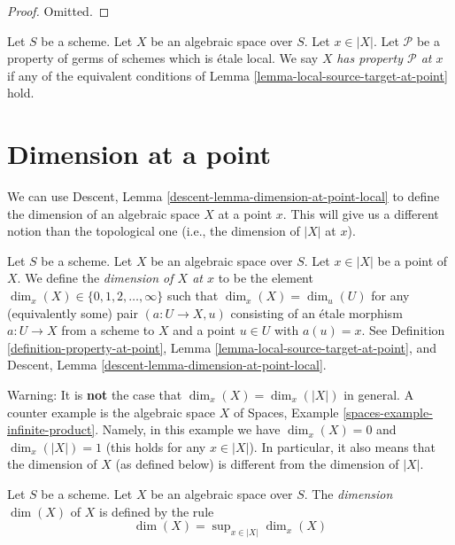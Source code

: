 \begin{proof}
Omitted.
\end{proof}

\begin{definition}
\label{definition-property-at-point}
Let $S$ be a scheme. Let $X$ be an algebraic space over $S$.
Let $x \in |X|$. Let $\mathcal{P}$ be a property of germs of schemes which is
\'etale local.
We say $X$ {\it has property $\mathcal{P}$ at $x$} if any of the
equivalent conditions of
Lemma \ref{lemma-local-source-target-at-point}
hold.
\end{definition}





\section{Dimension at a point}
\label{section-dimension}

\noindent
We can use
Descent, Lemma \ref{descent-lemma-dimension-at-point-local}
to define the dimension of an algebraic
space $X$ at a point $x$. This will give us a different notion than the
topological one (i.e., the dimension of $|X|$ at $x$).

\begin{definition}
\label{definition-dimension-at-point}
Let $S$ be a scheme.
Let $X$ be an algebraic space over $S$.
Let $x \in |X|$ be a point of $X$.
We define the {\it dimension of $X$ at $x$} to be
the element $\dim_x(X) \in \{0, 1, 2, \ldots, \infty\}$
such that $\dim_x(X) = \dim_u(U)$ for any (equivalently some)
pair $(a : U \to X, u)$ consisting of an \'etale morphism $a : U \to X$
from a scheme to $X$ and a point $u \in U$ with $a(u) = x$.
See
Definition \ref{definition-property-at-point},
Lemma \ref{lemma-local-source-target-at-point}, and
Descent, Lemma \ref{descent-lemma-dimension-at-point-local}.
\end{definition}

\noindent
Warning: It is {\bf not} the case that $\dim_x(X) = \dim_x(|X|)$
in general. A counter example is the algebraic space $X$ of
Spaces, Example \ref{spaces-example-infinite-product}.
Namely, in this example we have $\dim_x(X) = 0$ and
$\dim_x(|X|) = 1$ (this holds for any $x \in |X|$).
In particular, it also means that the dimension of $X$ (as defined
below) is different from the dimension of $|X|$.

\begin{definition}
\label{definition-dimension}
Let $S$ be a scheme. Let $X$ be an algebraic space over $S$.
The {\it dimension} $\dim(X)$ of $X$ is defined by the rule
$$
\dim(X) = \sup\nolimits_{x \in |X|} \dim_x(X)
$$
\end{definition}

